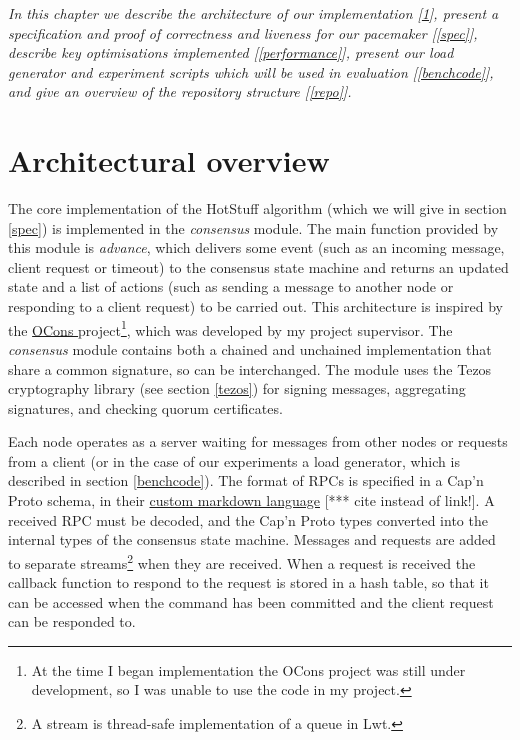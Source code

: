 \textit{In this chapter we describe the architecture of our implementation [\ref{overview}], present a specification and proof of correctness and liveness for our pacemaker [\ref{spec}], describe key optimisations implemented [\ref{performance}], present our load generator and experiment scripts which will be used in evaluation [\ref{benchcode}], and give an overview of the repository structure [\ref{repo}].}

\section{Architectural overview} \label{overview}
The core implementation of the HotStuff algorithm (which we will give in section \ref{spec}) is implemented in the \textit{consensus} module. The main function provided by this module is \textit{advance}, which delivers some event (such as an incoming message, client request or timeout) to the consensus state machine and returns an updated state and a list of actions (such as sending a message to another node or responding to a client request) to be carried out. This architecture is inspired by the \href{https://github.com/Cjen1/OCons}{OCons }project\footnote{At the time I began implementation the OCons project was still under development, so I was unable to use the code in my project.}, which was developed by my project supervisor. The \textit{consensus} module contains both a chained and unchained implementation that share a common signature, so can be interchanged. The module uses the Tezos cryptography library (see section \ref{tezos}) for signing messages, aggregating signatures, and checking quorum certificates.

Each node operates as a server waiting for messages from other nodes or requests from a client (or in the case of our experiments a load generator, which is described in section \ref{benchcode}). The format of RPCs is specified in a Cap'n Proto schema, in their \href{https://capnproto.org/language.html}{custom markdown language} [*** cite instead of link!]. A received RPC must be decoded, and the Cap'n Proto types converted into the internal types of the consensus state machine. Messages and requests are added to separate streams\footnote{A stream is thread-safe implementation of a queue in Lwt.} when they are received. When a request is received the callback function to respond to the request is stored in a hash table, so that it can be accessed when the command has been committed and the client request can be responded to.

